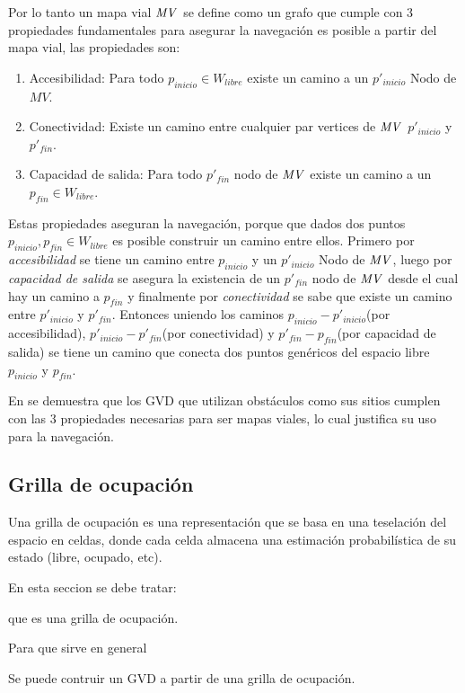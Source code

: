 Por lo tanto un mapa vial $\mathit{MV}$ se define como un grafo que cumple con 3 propiedades fundamentales para asegurar la navegación es posible a partir del mapa vial, las propiedades son:

\begin{enumerate}
\item Accesibilidad: Para todo $p_{inicio} \in W_{libre}$ existe un camino a un $p'_{inicio}$ Nodo de $MV$.
\item Conectividad: Existe un camino entre cualquier par vertices de $\mathit{MV}$ $p'_{inicio}$ y $p'_{fin}$.
\item Capacidad de salida: Para todo $p'_{fin}$ nodo de $\mathit{MV}$ existe un camino a un $p_{fin} \in W_{libre}$.
\end{enumerate}

Estas propiedades aseguran la navegación, porque que dados dos puntos $p_{inicio},p_{fin}\in W_{libre}$ es posible construir un camino entre ellos. Primero por \emph{accesibilidad} se tiene un camino entre $p_{inicio}$ y un $p'_{inicio}$ Nodo de $\mathit{MV}$, luego por \emph{capacidad de salida} se asegura la existencia de un  $p'_{fin}$ nodo de $\mathit{MV}$ desde el cual hay un camino a $p_{fin}$ y finalmente por \emph{conectividad} se sabe que existe un camino entre $p'_{inicio}$ y $p'_{fin}$. Entonces uniendo los caminos $p_{inicio} - p'_{inicio}$(por accesibilidad), $p'_{inicio} - p'_{fin}$(por conectividad) y $p'_{fin} - p_{fin}$(por capacidad de salida) se tiene un camino que conecta dos puntos genéricos del espacio libre $p_{inicio}$ y $p_{fin}$.

En \cite{choset2005principles} se demuestra que los GVD que utilizan obstáculos como sus sitios cumplen con las 3 propiedades necesarias para ser mapas viales, lo cual justifica su uso para la navegación.

\subsection{Grilla de ocupación}
Una grilla de ocupación es una representación que se basa en una teselación del espacio en celdas, donde cada celda almacena una estimación probabilística de su estado (libre, ocupado, etc). 

En esta seccion se debe tratar:

que es una grilla de ocupación.

Para que sirve en general

Se puede contruir un GVD a partir de una grilla de ocupación.

